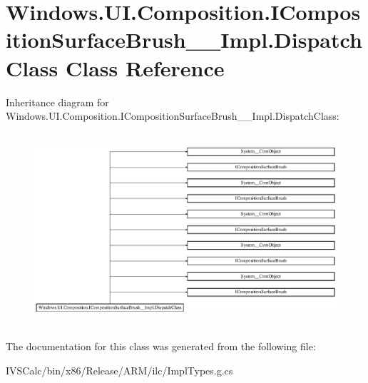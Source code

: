 \hypertarget{class_windows_1_1_u_i_1_1_composition_1_1_i_composition_surface_brush_____impl_1_1_dispatch_class}{}\section{Windows.\+U\+I.\+Composition.\+I\+Composition\+Surface\+Brush\+\_\+\+\_\+\+Impl.\+Dispatch\+Class Class Reference}
\label{class_windows_1_1_u_i_1_1_composition_1_1_i_composition_surface_brush_____impl_1_1_dispatch_class}
Inheritance diagram for Windows.\+U\+I.\+Composition.\+I\+Composition\+Surface\+Brush\+\_\+\+\_\+\+Impl.\+Dispatch\+Class\+:\begin{figure}[H]
\begin{center}
\leavevmode
\includegraphics[height=7.162791cm]{class_windows_1_1_u_i_1_1_composition_1_1_i_composition_surface_brush_____impl_1_1_dispatch_class}
\end{center}
\end{figure}


The documentation for this class was generated from the following file\+:\begin{DoxyCompactItemize}
\item 
I\+V\+S\+Calc/bin/x86/\+Release/\+A\+R\+M/ilc/Impl\+Types.\+g.\+cs\end{DoxyCompactItemize}

